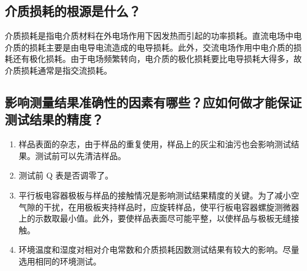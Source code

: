 \documentclass[a4paper,utf8]{article}
\begin{document}
    \subsection{介质损耗的根源是什么？}
        介质损耗是指电介质材料在外电场作用下因发热而引起的功率损耗。直流电场中电介质的损耗主要是由电导电流造成的电导损耗。此外，交流电场作用中电介质的损耗还有极化损耗。由于电场频繁转向，电介质的极化损耗要比电导损耗大得多，故介质损耗通常是指交流损耗。
    \subsection{影响测量结果准确性的因素有哪些？应如何做才能保证测试结果的精度？}
        \begin{enumerate}
            \item 样品表面的杂志，由于样品的重复使用，样品上的灰尘和油污也会影响测试结果。测试前可以先清洁样品。
            \item 测试前 Q 表是否调零了。
            \item 平行板电容器极板与样品的接触情况是影响测试结果精度的关键。为了减小空气隙的干扰，在用极板夹持样品时，应旋转样品，使平行板电容器螺旋测微器上的示数取最小值。此外，要使样品表面尽可能平整，以使样品与极板无缝接触。
            \item 环境温度和湿度对相对介电常数和介质损耗因数测试结果有较大的影响。尽量选用相同的环境测试。
        \end{enumerate}
\end{document}
